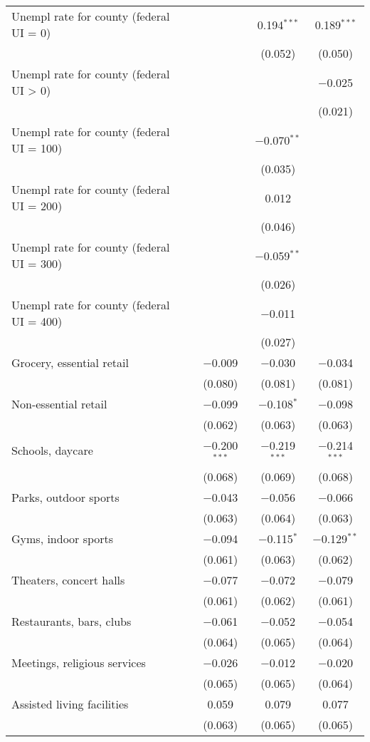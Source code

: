 \begin{table}[!htbp]
\begin{tabular}{@{\extracolsep{5pt}}lccc}
  Unempl rate for county (federal UI = 0) &  & 0.194$^{***}$ & 0.189$^{***}$ \\ 
  &  & (0.052) & (0.050) \\ 
  Unempl rate for county (federal UI > 0) &  &  & $-$0.025 \\ 
  &  &  & (0.021) \\ 
  Unempl rate for county (federal UI = 100) &  & $-$0.070$^{**}$ &  \\ 
  &  & (0.035) &  \\ 
  Unempl rate for county (federal UI = 200) &  & 0.012 &  \\ 
  &  & (0.046) &  \\ 
  Unempl rate for county (federal UI = 300) &  & $-$0.059$^{**}$ &  \\ 
  &  & (0.026) &  \\ 
  Unempl rate for county (federal UI = 400) &  & $-$0.011 &  \\ 
  &  & (0.027) &  \\ 
  Grocery, essential retail & $-$0.009 & $-$0.030 & $-$0.034 \\ 
  & (0.080) & (0.081) & (0.081) \\ 
  Non-essential retail & $-$0.099 & $-$0.108$^{*}$ & $-$0.098 \\ 
  & (0.062) & (0.063) & (0.063) \\ 
  Schools, daycare & $-$0.200$^{***}$ & $-$0.219$^{***}$ & $-$0.214$^{***}$ \\ 
  & (0.068) & (0.069) & (0.068) \\ 
  Parks, outdoor sports & $-$0.043 & $-$0.056 & $-$0.066 \\ 
  & (0.063) & (0.064) & (0.063) \\ 
  Gyms, indoor sports & $-$0.094 & $-$0.115$^{*}$ & $-$0.129$^{**}$ \\ 
  & (0.061) & (0.063) & (0.062) \\ 
  Theaters, concert halls & $-$0.077 & $-$0.072 & $-$0.079 \\ 
  & (0.061) & (0.062) & (0.061) \\ 
  Restaurants, bars, clubs & $-$0.061 & $-$0.052 & $-$0.054 \\ 
  & (0.064) & (0.065) & (0.064) \\ 
  Meetings, religious services & $-$0.026 & $-$0.012 & $-$0.020 \\ 
  & (0.065) & (0.065) & (0.064) \\ 
  Assisted living facilities & 0.059 & 0.079 & 0.077 \\ 
  & (0.063) & (0.065) & (0.065) \\ 

\end{tabular}
\end{table}
